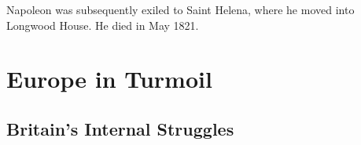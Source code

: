 Napoleon was subsequently exiled to Saint Helena, where he moved into Longwood House.
He died in May 1821.

\section{Europe in Turmoil}

\subsection*{Britain's Internal Struggles}


